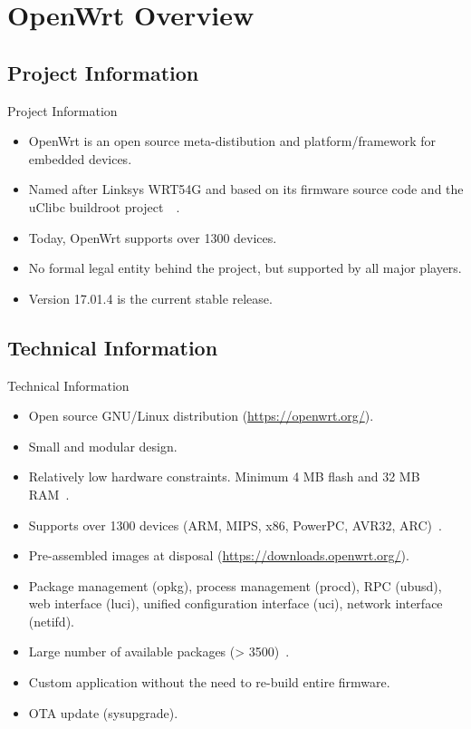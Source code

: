 \section{OpenWrt Overview}

\subsection{Project Information}
\begin{frame}{Project Information}
    \pause
    \begin{itemize}[<+-|alert@+>]
        \item OpenWrt is an open source meta-distibution and platform/framework for embedded devices.
        \item Named after Linksys WRT54G and based on its firmware source code and the uClibc buildroot project~\cite{wikipedia-linksys}~\cite{wifiplanet-story}.
        \item Today, OpenWrt supports over 1300 devices.
        \item No formal legal entity behind the project, but supported by all major players.
        \item Version 17.01.4 is the current stable release.
    \end{itemize}
\end{frame}

\subsection{Technical Information}
\begin{frame}{Technical Information}
    \pause
    \begin{itemize}[<+-|alert@+>]
        \item Open source GNU/Linux distribution (\url{https://openwrt.org/}).
        \item Small and modular design.
        \item Relatively low hardware constraints. Minimum 4 MB flash and 32 MB RAM~\cite{openwrt-requirements}.
        \item Supports over 1300 devices (ARM, MIPS, x86, PowerPC, AVR32, ARC)~\cite{openwrt-devices}.
        \item Pre-assembled images at disposal (\url{https://downloads.openwrt.org/}).
        \item Package management (opkg), process management (procd), RPC (ubusd), web interface (luci), unified configuration interface (uci), network interface (netifd).
        \item Large number of available packages (> 3500)~\cite{openwrt-packages}.
        \item Custom application without the need to re-build entire firmware.
        \item OTA update (sysupgrade).
    \end{itemize}
\end{frame}

